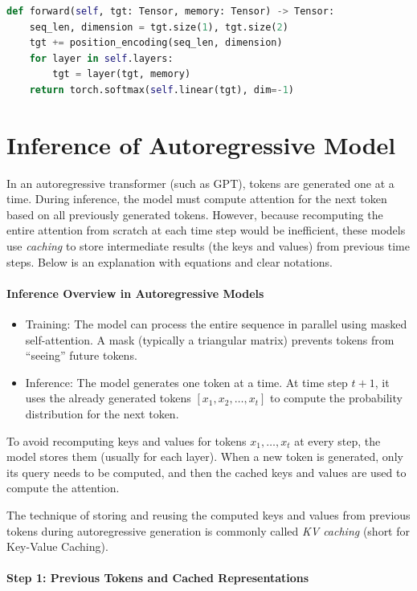\begin{lstlisting}[language=Python]
def forward(self, tgt: Tensor, memory: Tensor) -> Tensor:
	seq_len, dimension = tgt.size(1), tgt.size(2)
	tgt += position_encoding(seq_len, dimension)
	for layer in self.layers:
		tgt = layer(tgt, memory)
	return torch.softmax(self.linear(tgt), dim=-1)
\end{lstlisting}


\section{Inference of Autoregressive Model}

In an autoregressive transformer (such as GPT), tokens are generated one at a time. During inference, the model must compute attention for the next token based on all previously generated tokens. However, because recomputing the entire attention from scratch at each time step would be inefficient, these models use \textit{caching} to store intermediate results (the keys and values) from previous time steps. Below is an explanation with equations and clear notations.

\paragraph{Inference Overview in Autoregressive Models}
\begin{itemize}
	\item Training: The model can process the entire sequence in parallel using masked self-attention. A mask (typically a triangular matrix) prevents tokens from ``seeing'' future tokens.
	\item Inference: The model generates one token at a time. At time step \( t+1 \), it uses the already generated tokens \( [x_1, x_2, \dots, x_t] \) to compute the probability distribution for the next token.
\end{itemize}

To avoid recomputing keys and values for tokens \( x_1, \dots, x_t \) at every step, the model stores them (usually for each layer). When a new token is generated, only its query needs to be computed, and then the cached keys and values are used to compute the attention.

The technique of storing and reusing the computed keys and values from previous tokens during autoregressive generation is commonly called \textit{KV caching} (short for Key-Value Caching).

\paragraph{Step 1: Previous Tokens and Cached Representations}

